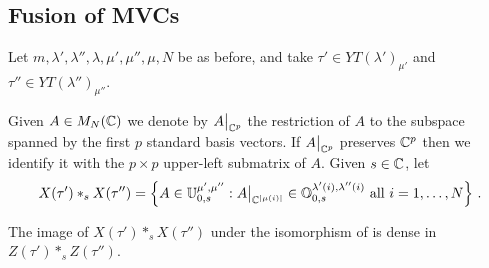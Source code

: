 \documentclass[draft]{article}
\begin{document}
% 
% 
% 
\subsection{Fusion of MVCs}
Let $m,\lambda',\lambda'',\lambda,\mu',\mu'',\mu,N$ be as before, and take $\tau'\in YT(\lambda')_{\mu'}$ and $\tau''\in YT(\lambda'')_{\mu''}$. 
% 

Given $A \in M_N(\mathbb C)$ we denote by 
$A\big|_{\mathbb C^p}$ 
the restriction of $A$ to the subspace spanned by the first $p$ standard basis vectors. If $A\big|_{\mathbb C^p}$ preserves $\mathbb C^p$ then we identify it with the $p\times p$ upper-left submatrix of $A$. 
Given $s\in\mathbb C$, let 
\begin{equation*}
    X(\tau')\ast_s X(\tau'') = \left\{A\in\mathbb U_{0,s}^{\mu',\mu''} : A \big|_{\mathbb C^{|\mu(i)|}} \in \mathbb O_{0,s}^{\lambda'(i),\lambda''(i)} \text{ all } i=1,\dots,N\right\}\,.
\end{equation*}
% 


\begin{proposition}
    The image of $X(\tau')\ast_s X(\tau'')$ under the isomorphism of  is dense in $Z(\tau')\ast_s Z(\tau'')$. 
\end{proposition}
% 
\end{document}
